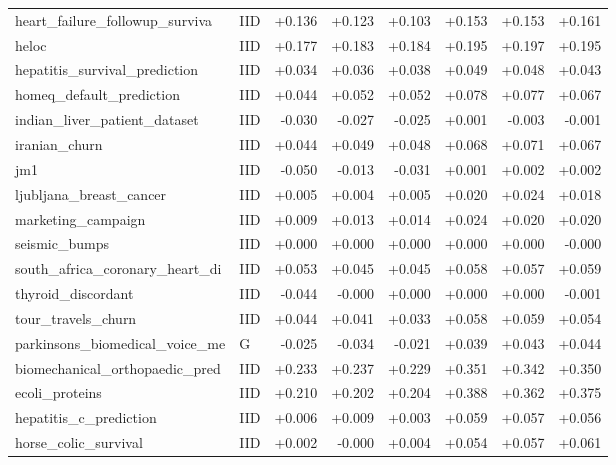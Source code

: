 \begin{longtable}{@{}p{3.95cm}lrrrrrr@{}}
heart\_\allowbreak{}failure\_\allowbreak{}followup\_\allowbreak{}surviva & IID & +0.136 & +0.123 & +0.103 & +0.153 & +0.153 & +0.161\\
heloc & IID & +0.177 & +0.183 & +0.184 & +0.195 & +0.197 & +0.195\\
hepatitis\_\allowbreak{}survival\_\allowbreak{}prediction & IID & +0.034 & +0.036 & +0.038 & +0.049 & +0.048 & +0.043\\
homeq\_\allowbreak{}default\_\allowbreak{}prediction & IID & +0.044 & +0.052 & +0.052 & +0.078 & +0.077 & +0.067\\
indian\_\allowbreak{}liver\_\allowbreak{}patient\_\allowbreak{}dataset & IID & -0.030 & -0.027 & -0.025 & +0.001 & -0.003 & -0.001\\
iranian\_\allowbreak{}churn & IID & +0.044 & +0.049 & +0.048 & +0.068 & +0.071 & +0.067\\
jm1 & IID & -0.050 & -0.013 & -0.031 & +0.001 & +0.002 & +0.002\\
ljubljana\_\allowbreak{}breast\_\allowbreak{}cancer & IID & +0.005 & +0.004 & +0.005 & +0.020 & +0.024 & +0.018\\
marketing\_\allowbreak{}campaign & IID & +0.009 & +0.013 & +0.014 & +0.024 & +0.020 & +0.020\\
seismic\_\allowbreak{}bumps & IID & +0.000 & +0.000 & +0.000 & +0.000 & +0.000 & -0.000\\
south\_\allowbreak{}africa\_\allowbreak{}coronary\_\allowbreak{}heart\_\allowbreak{}di & IID & +0.053 & +0.045 & +0.045 & +0.058 & +0.057 & +0.059\\
thyroid\_\allowbreak{}discordant & IID & -0.044 & -0.000 & +0.000 & +0.000 & +0.000 & -0.001\\
tour\_\allowbreak{}travels\_\allowbreak{}churn & IID & +0.044 & +0.041 & +0.033 & +0.058 & +0.059 & +0.054\\
parkinsons\_\allowbreak{}biomedical\_\allowbreak{}voice\_\allowbreak{}me & G & -0.025 & -0.034 & -0.021 & +0.039 & +0.043 & +0.044\\
\midrule
biomechanical\_\allowbreak{}orthopaedic\_\allowbreak{}pred & IID & +0.233 & +0.237 & +0.229 & +0.351 & +0.342 & +0.350\\
ecoli\_\allowbreak{}proteins & IID & +0.210 & +0.202 & +0.204 & +0.388 & +0.362 & +0.375\\
hepatitis\_\allowbreak{}c\_\allowbreak{}prediction & IID & +0.006 & +0.009 & +0.003 & +0.059 & +0.057 & +0.056\\
horse\_\allowbreak{}colic\_\allowbreak{}survival & IID & +0.002 & -0.000 & +0.004 & +0.054 & +0.057 & +0.061\\

\end{longtable}
